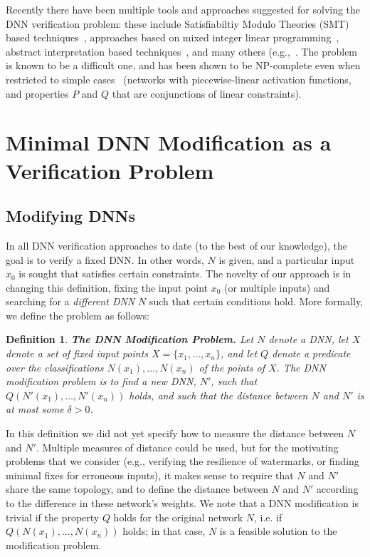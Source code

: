 \documentclass{easychair}
\newtheorem{definition}{Definition}
\begin{document}
Recently there have been multiple tools and approaches suggested for
solving the DNN verification problem: these include Satisfiabiltiy
Modulo Theories (SMT) based
techniques~\cite{KaBaDiJuKo17Reluplex,KaHuIbJuLaLiShThWuZeDiKoBa19Marabou},
approaches based on mixed integer linear
programming~\cite{Ehlers2017,TjXiTe19}, abstract interpretation based
techniques~\cite{GeMiDrTsChVe18}, and many others
(e.g.,~\cite{HuKwWaWu17,NaKaRySaWa17}. The problem is known to be a
difficult one, and has been shown to be NP-complete even when
restricted to simple cases~\cite{KaBaDiJuKo17Reluplex} (networks with piecewise-linear activation
functions, and properties $P$ and $Q$ that are conjunctions of linear constraints).


\section{Minimal DNN Modification as a Verification Problem}
\label{sec:minimizationProblem}

\subsection{Modifying DNNs}

In all DNN verification approaches to date (to the best of our
knowledge), the goal is to verify a fixed DNN. In other words, $N$ is
given, and a particular input $x_0$ is sought that satisfies certain constraints.
The novelty of our approach is in changing this definition, fixing
the input point $x_0$ (or multiple inputs) and searching for a
\emph{different DNN} $N$ such that certain conditions hold.
More formally, we define the problem as follows:

\begin{definition}\textbf{The DNN Modification Problem.}
  Let $N$ denote a DNN, let $X$ denote a set of fixed input points
  $X=\{x_1, \ldots, x_n\}$, and let $Q$ denote a predicate over the
  classifications $N(x_1),\ldots,N(x_n)$ of the points of $X$. The
  \emph{DNN modification problem} is to find a new DNN, $N'$, such that
  $Q(N'(x_1),\ldots,N'(x_n))$ holds, and such that the distance
  between $N$ and $N'$ is at most some $\delta>0$.
\end{definition}

In this definition we did not yet specify how to measure the distance
between $N$ and $N'$. Multiple measures of distance could be used, but for the
motivating problems that we consider (e.g., verifying the resilience
of watermarks, or finding minimal fixes for erroneous inputs), it
makes sense to require that $N$ and $N'$ share the same topology, and
to define the distance between $N$ and $N'$ according to the
difference in these network's weights. We note that a DNN modification
is trivial if the property $Q$ holds for the original network $N$,
i.e. if $Q(N(x_1),\ldots,N(x_n))$ holds; in that case, $N$ is a
feasible solution to the modification problem.
\end{document}
